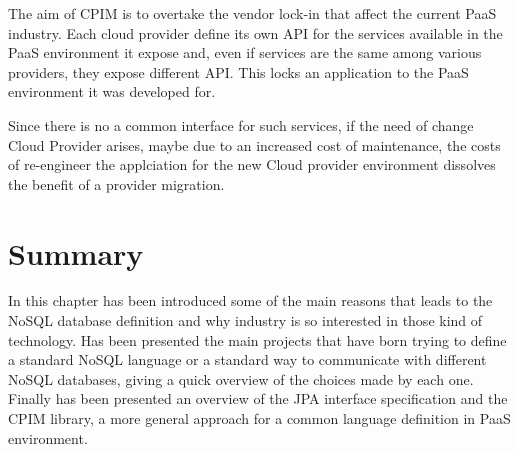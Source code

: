 \newparagraph The aim of CPIM is to overtake the vendor lock-in that affect the current PaaS industry. Each cloud provider define its own API for the services available in the PaaS environment it expose and, even if services are the same among various providers, they expose different API. This locks an application to the PaaS environment it was developed for.

\noindent Since there is no a common interface for such services, if the need of change Cloud Provider arises, maybe due to an increased cost of maintenance, the costs of re-engineer the applciation for the new Cloud provider environment dissolves the benefit of a provider migration.

\section{Summary}
In this chapter has been introduced some of the main reasons that leads to the NoSQL database definition and why industry is so interested in those kind of technology. 
\noindent Has been presented the main projects that have born trying to define a standard NoSQL language or a standard way to communicate with different NoSQL databases, giving a quick overview of the choices made by each one. 
\noindent Finally has been presented an overview of the JPA interface specification and the CPIM library, a more general approach for a common language definition in PaaS environment.
